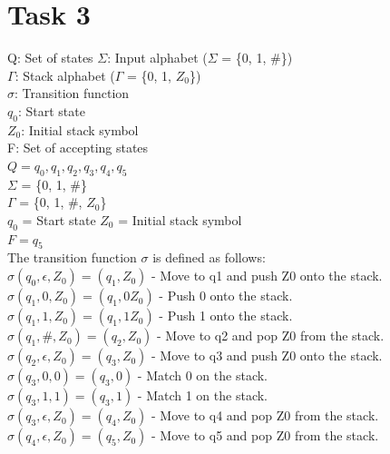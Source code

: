 \chapter{Task 3}
Q: Set of states
$\Sigma$: Input alphabet ($\Sigma$ = \{0, 1, \#\})\\
$\Gamma$: Stack alphabet ($\Gamma$ = \{0, 1, $Z_0$\})\\
$\sigma$: Transition function \\
$q_0$: Start state\\
$Z_0$: Initial stack symbol\\
F: Set of accepting states \\
%
$Q = {q_0, q_1, q_2, q_3, q_4, q_5}$ \\
$\Sigma$ = \{0, 1, \#\} \\
$\Gamma$ = \{0, 1, \#, $Z_0$\} \\
$q_0$ = Start state
$Z_0$ = Initial stack symbol \\
$F = {q_5}$ \\
%
The transition function $\sigma$ is defined as follows: \\
%
    $\sigma(q_0, \epsilon, Z_0) = (q_1, Z_0)$ - Move to q1 and push Z0 onto the stack.\\
$\sigma(q_1, 0, Z_0) = (q_1, 0Z_0)$ - Push 0 onto the stack.\\
$\sigma(q_1, 1, Z_0) = (q_1, 1Z_0)$ - Push 1 onto the stack.\\
$\sigma(q_1, \#, Z_0) = (q_2, Z_0)$ - Move to q2 and pop Z0 from the stack.\\
$\sigma(q_2, \epsilon, Z_0) = (q_3, Z_0)$ - Move to q3 and push Z0 onto the stack.\\
$\sigma(q_3, 0, 0) = (q_3, 0)$ - Match 0 on the stack.\\
$\sigma(q_3, 1, 1) = (q_3, 1)$ - Match 1 on the stack.\\
$\sigma(q_3, \epsilon, Z_0) = (q_4, Z_0)$ - Move to q4 and pop Z0 from the stack.\\
$\sigma(q_4, \epsilon, Z_0) = (q_5, Z_0)$ - Move to q5 and pop Z0 from the stack.\\


